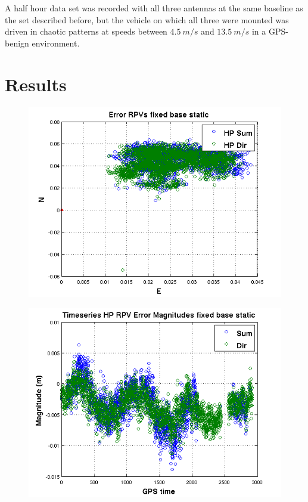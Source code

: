 A half hour data set was recorded with all three antennas at the same baseline as the set described before, but the vehicle on which all three were mounted was driven in chaotic patterns at speeds between $4.5~m/s$ and $13.5~m/s$ in a GPS-benign environment.


\section{Results}

\begin{figure}[ht] \centering \label{fig:fixed_static_err_rpv}
    \includegraphics[width=6.5in]{./figs/fixed_static_error_rpv.png}
    \caption{}
\end{figure}

\begin{figure}[ht] \centering \label{fig:fixed_static_err_mag}
    \includegraphics[width=6.5in]{./figs/fixed_static_err_mags.png}
    \caption{}
\end{figure}

